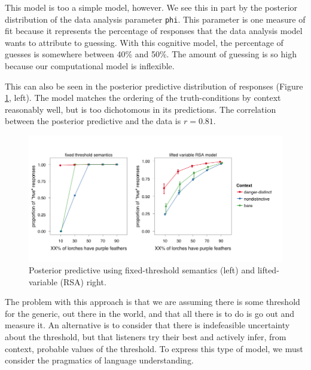 \documentclass[10pt,letterpaper]{article}
\begin{document}
This model is too a simple model, however. We see this in part by the posterior distribution of the data analysis parameter \lstinline{phi}. This parameter is one measure of fit because it represents the percentage of responses that the data analysis model wants to attribute to guessing. With this cognitive model, the percentage of guesses is somewhere between 40\% and 50\%. The amount of guessing is so high because our computational model is inflexible.

This can also be seen in the posterior predictive distribution of responses (Figure \ref{fig:bda1posteriorpred}, left). The model matches the ordering of the truth-conditions by context reasonably well, but is too dichotomous in its predictions. The correlation between the posterior predictive and the data is $r = 0.81$. 

\begin{figure}
\centering
    \includegraphics[width=\columnwidth]{fig3_2pps}
    \caption{Posterior predictive using fixed-threshold semantics (left) and lifted-variable (RSA) right.}
  \label{fig:bda1posteriorpred}
\end{figure}

The problem with this approach is that we are assuming there is some threshold for the generic, out there in the world, and that all there is to do is go out and measure it. An alternative is to consider that there is indefeasible uncertainty about the threshold, but that listeners try their best and actively infer, from context, probable values of the threshold. To express this type of model, we must consider the pragmatics of language understanding. 
\end{document}
